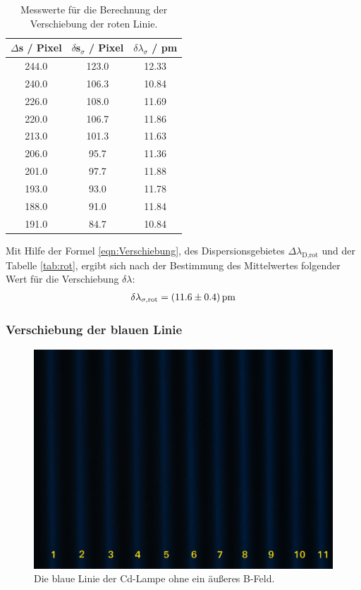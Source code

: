 \begin{table}[H]
  \centering
  \caption{Messwerte für die Berechnung der Verschiebung der roten Linie.}
  \label{tab:rot}
  \begin{tabular}{c c c}
    $\Delta$s / Pixel & $\delta$s$_{\sigma}$ / Pixel & $\delta \lambda_{\sigma}$ / pm \\
    \hline
    244.0 & 123.0 & 12.33 \\
    240.0 & 106.3 & 10.84 \\
    226.0 & 108.0 & 11.69 \\
    220.0 & 106.7 & 11.86 \\
    213.0 & 101.3 & 11.63 \\
    206.0 & 95.7  & 11.36 \\
    201.0 & 97.7  & 11.88 \\
    193.0 & 93.0  & 11.78 \\
    188.0 & 91.0  & 11.84 \\
    191.0 & 84.7  & 10.84 \\
    \hline
  \end{tabular}
\end{table}

Mit Hilfe der Formel \eqref{eqn:Verschiebung}, des Dispersionsgebietes $\Delta\lambda_\text{D,rot}$ und der Tabelle \eqref{tab:rot}, ergibt sich nach der Bestimmung des Mittelwertes folgender Wert für die Verschiebung $\delta\lambda$:
\begin{align*}
  \delta \lambda_{\sigma,\text{rot}} = (\num{11.6 +- 0.4})\,\text{pm} \\
\end{align*}



\subsubsection{Verschiebung der blauen Linie}
\begin{figure}[H]
  \centering
  \includegraphics[width=0.8\linewidth]{Bilder/BoB.JPG}
  \caption{Die blaue Linie der Cd-Lampe ohne ein äußeres B-Feld.}
  \label{fig:BoB}
\end{figure}

